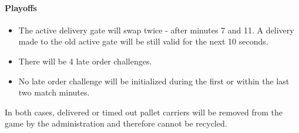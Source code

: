 \documentclass[12pt,twoside]{article}
\begin{document}
\paragraph{Playoffs}
\begin{itemize}
\item The active delivery gate will swap twice - after minutes 7
  and 11. A delivery made to the old active gate will be still
  valid for the next 10 seconds.
\item There will be 4 late order challenges. 
\item No late order challenge will be initialized during the first or within
  the last two match minutes.
\end{itemize}    


In both cases, delivered or timed out pallet carriers will be removed
from the game by the administration and therefore cannot be recycled.
\end{document}
